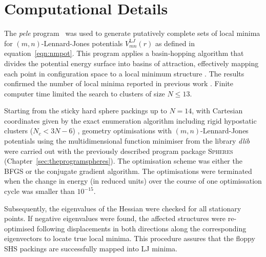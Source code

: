 

\section{Computational Details}

The \textit{pele} program~\autocite{_pelePythonenergy_2017} was used to generate
putatively complete sets of local minima for $(m,n)$-Lennard-Jones potentials
$V_{mn}^{\mathrm LJ}(r)$ as defined in equation~\eqref{eqn:nmpot}. This program
applies a basin-hopping algorithm that divides the potential energy surface into
basins of attraction, effectively mapping each point in configuration space to a
local minimum structure
\autocite{Li_MonteCarlominimizationapproach_1987,waless99,Wales_GlobalOptimizationBasinHopping_1997}.
The results confirmed the number of local minima reported in previous work
\autocite{Doye_Saddlepointsdynamics_2002}. Finite computer time limited the
search to clusters of size $N \leq 13$.

Starting from the sticky hard sphere packings up to $N=14$, with Cartesian
coordinates given by the exact enumeration algorithm
\autocite{Hoy_Structurefinitesphere_2012} including rigid hypostatic clusters
($N_c<3N-6$) \autocite{Holmes-Cerfon_EnumeratingRigidSphere_2016}, geometry
optimisations with $(m,n)$-Lennard-Jones potentials using the multidimensional
function minimiser from the \Cpp library \textit{dlib}
\autocite{King_DlibmlMachineLearning_2009} were carried out with the previously
described program package \textsc{Spheres}
(Chapter~\ref{sec:theprogramspheres}). The optimisation scheme was either the
\acf{BFGS} or the conjugate gradient algorithm. The optimisations were terminated
when the change in energy (in reduced units) over the course of one
optimissation cycle was smaller than $10^{-15}$. 

Subsequently, the eigenvalues of the Hessian were checked for all stationary
points. If negative eigenvalues were found, the affected structures were
re-optimised following displacements in both directions along the corresponding
eigenvectors to locate true local minima. This procedure assures that the floppy
\ac{SHS} packings are successfully mapped into \ac{LJ} minima.

